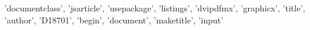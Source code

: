 {'documentclass', 'jsarticle', 'usepackage', 'listings', 'dvipdfmx', 'graphicx', 'title', 'author', 'D18701', 'begin', 'document', 'maketitle', 'input'}
